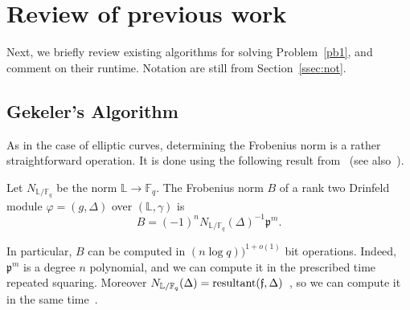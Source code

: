 \documentclass[sigconf]{acmart}
\newcommand{\F}{\mathbb{F}}
\renewcommand{\L}{\mathbb{L}}
\newcommand{\frakf}{\mathfrak{f}}
\newcommand{\frakp}{\mathfrak{p}}
\begin{document}
\section{Review of previous work}

Next, we briefly review existing algorithms for solving
Problem~\ref{pb1}, and comment on their runtime. Notation are still
from Section~\ref{ssec:not}.


\subsection{Gekeler's Algorithm}\label{ssec:gek}

As in the case of elliptic curves, determining the Frobenius norm is a
rather straightforward operation. It is done using the following
result from~\cite[Th.~2.11]{frobdist} (see also~\cite{HsYu00}).

\begin{proposition}\label{frobnorm}
Let $N_{\L/\F_q}$ be the norm $\L \to \F_q$. The Frobenius norm $B$ of a rank two Drinfeld module $\varphi=(g,\Delta)$ 
  over $(\L,\gamma)$ is
  \[B = (-1)^n N_{\L/\F_q}(\Delta)^{-1}\frakp^m.\]
\end{proposition}
In particular, $B$ can be computed in $(n \log q))^{1+o(1)}$ bit
operations. Indeed, $\frakp^m$ is a degree $n$ polynomial, and we can
compute it in the prescribed time repeated squaring. Moreover
$N_{\L/\F_q}(\Delta) =
\textnormal{resultant}(\frakf,\Delta)$~\cite{Pohst:1989:AAN:76692},
so we can compute it in the same time~\cite{Gathen:2003:MCA:945759}.
\end{document}
